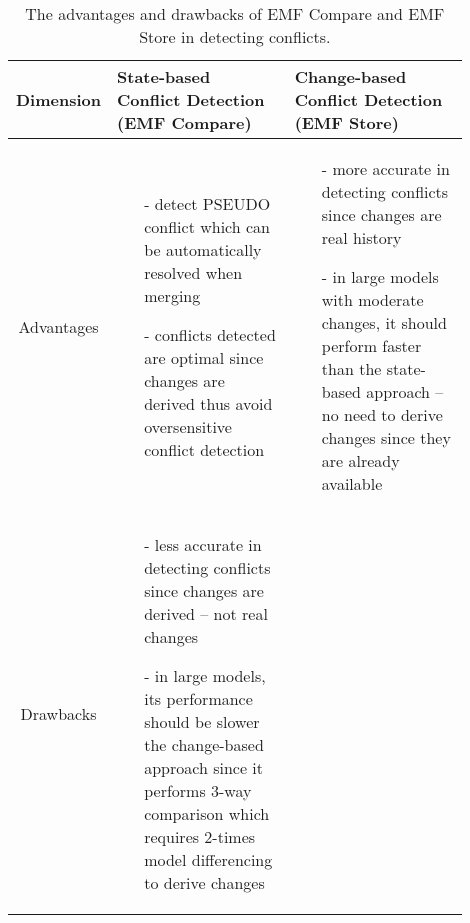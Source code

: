 \begin{table*}[ht]
  \centering
  \caption{The advantages and drawbacks of EMF Compare and EMF Store in detecting conflicts.}
  \label{tab:accuracy_emfcompare_emfstore}
  \begin{scriptsize}
  \begin{tabular}{|p{0.1\linewidth}|p{0.4\linewidth}|p{0.4\linewidth}|}
    \hline
    \textbf{Dimension}
    & \textbf{State-based Conflict Detection (EMF Compare)}
    & \textbf{Change-based Conflict Detection (EMF Store)}\\
    \hline
    \multicolumn{1}{|c|}{Advantages}
    &
    \begin{minipage}[t]{\linewidth}
      \raggedright
      \begin{itemize}[leftmargin=9pt]
        \setlength\itemsep{2pt}
        \item[-] detect \textsf{PSEUDO} conflict which can be automatically resolved when merging
        \item[-] conflicts detected are optimal since changes are derived thus avoid oversensitive conflict detection
        \item[]
      \end{itemize}
    \end{minipage}
    &
    \begin{minipage}[t]{\linewidth}
      \raggedright
      \begin{itemize}[leftmargin=9pt]
        \setlength\itemsep{2pt}
        \item[-] more accurate in detecting conflicts since changes are real history
        \item[-] in large models with moderate changes, it should perform faster than the state-based approach -- no need to derive changes since they are already available 
        \item[]
      \end{itemize} 
    \end{minipage}
    \\ 
    \hline
    \multicolumn{1}{|c|}{Drawbacks}
    &
    \begin{minipage}[t]{\linewidth}
      \raggedright
      \begin{itemize}[leftmargin=9pt]
        \setlength\itemsep{2pt}
        \item[-] less accurate in detecting conflicts since changes are derived -- not real changes
        \item[-] in large models, its performance should be slower the change-based approach since it performs 3-way comparison which requires 2-times model differencing to derive changes

\end{itemize}
\end{minipage}
\end{tabular}
\end{scriptsize}
\end{table*}

